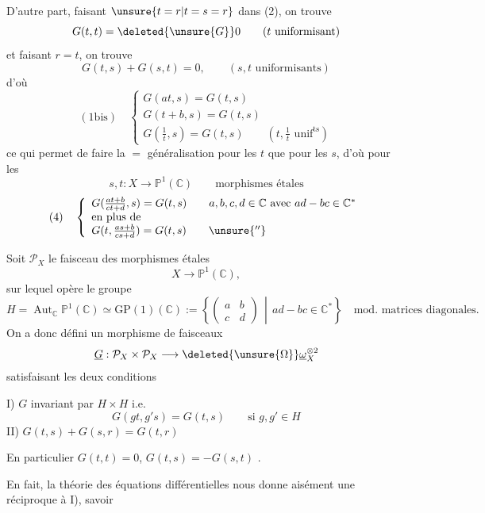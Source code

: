 D'autre part, faisant $\unsure{t=r|t=s=r}$ dans (2), on trouve
\[
G(t,t)=\deleted{\unsure{G}}0\qquad(t\text{ uniformisant})
\]
et faisant $r=t$, on trouve
\[
G(t,s)+G(s,t)=0,\qquad(s,t\text{ uniformisants})
\]
d'où
\[
(1\mathrm{bis})\quad\left\{\begin{array}{l}
G(at,s)=G(t,s)\\
G(t+b,s)=G(t,s)\\
G(\frac1t,s)=G(t,s)\qquad(t,\frac1t\text{ unif}^{\mathrm{ts}})
\end{array}\right.
\]
ce qui permet de faire la $=$ généralisation pour les $t$ que pour les $s$, d'où pour les
\[
s,t:X\longrightarrow\mathbb P^1(\mathbb C)\qquad\text{morphismes étales}
\]
\[
(4)\quad\left\{\begin{array}{l}
G(\frac{at+b}{ct+d},s)=G(t,s)\qquad a,b,c,d\in\mathbb C\text{ avec }ad-bc\in\mathbb C^*\\
\text{en plus de}\\
G(t,\frac{as+b}{cs+d})=G(t,s)\qquad\unsure{''}
\end{array}\right.
\]

Soit $\mathcal P_X$ le faisceau des morphismes  étales
\[
X\longrightarrow\mathbb P^1(\mathbb C),
\]
sur lequel opère le groupe
\[
H=\operatorname{Aut}_{\mathbb C}\mathbb P^1(\mathbb C)\simeq\mathrm{GP}(1)(\mathbb C):=\left\{\left(\begin{matrix}a&b\\c&d\end{matrix}\right)\,\middle|\,ad-bc\in\mathbb C^*\right\}\quad\text{mod. matrices diagonales}.
\]
On a donc défini un morphisme de faisceaux
\[
\underline G:\mathcal P_X\times\mathcal P_X\longrightarrow\deleted{\unsure{\Omega}}\underline\omega_X^{\otimes2}
\]
satisfaisant les deux conditions

I) $G$ invariant par $H\times H$ i.e.
\[
G(gt,g's)=G(t,s)\qquad\text{si }g,g'\in H
\]
II) $G(t,s)+G(s,r)=G(t,r)$

En particulier $G(t,t)=0$, $G(t,s)=-G(s,t)$ .

En fait, la théorie des équations différentielles nous donne aisément une réciproque à I), savoir
